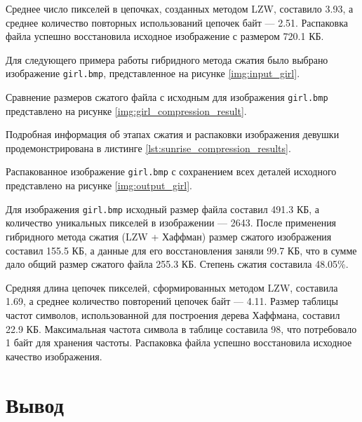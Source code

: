 Среднее число пикселей в цепочках, созданных методом LZW, составило 3.93, а среднее количество повторных использований цепочек байт --- 2.51. Распаковка файла успешно восстановила исходное изображение с размером 720.1 КБ.

\clearpage


Для следующего примера работы гибридного метода сжатия было выбрано изображение \texttt{girl.bmp}, представленное на рисунке \ref{img:input_girl}.


Сравнение размеров сжатого файла с исходным для изображения \texttt{girl.bmp} представлено на рисунке \ref{img:girl_compression_result}. 


Подробная информация об этапах сжатия и распаковки изображения девушки продемонстрирована в листинге \ref{lst:sunrise_compression_results}.


Распакованное изображение \texttt{girl.bmp} с сохранением всех деталей исходного представлено на рисунке \ref{img:output_girl}.


Для изображения \texttt{girl.bmp} исходный размер файла составил 491.3 КБ, а количество уникальных пикселей в изображении --- 2643. После применения гибридного метода сжатия (LZW + Хаффман) размер сжатого изображения составил 155.5 КБ, а данные для его восстановления заняли 99.7 КБ, что в сумме дало общий размер сжатого файла 255.3 КБ. Степень сжатия составила 48.05\%.

Средняя длина цепочек пикселей, сформированных методом LZW, составила 1.69, а среднее количество повторений цепочек байт --- 4.11. Размер таблицы частот символов, использованной для построения дерева Хаффмана, составил 22.9 КБ. Максимальная частота символа в таблице составила 98, что потребовало 1 байт для хранения частоты. Распаковка файла успешно восстановила исходное качество изображения.

\section*{Вывод}

